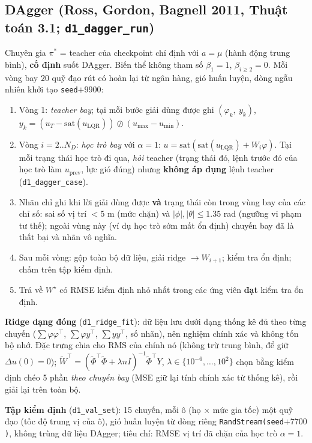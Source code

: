 \documentclass[11pt]{article}
\newcommand{\T}{^{\!\top}}
\newcommand{\uL}{u_{\mathrm{LQR}}}
\begin{document}
\subsection{DAgger (Ross, Gordon, Bagnell 2011, Thuật toán 3.1; \texttt{d1\_dagger\_run})}
Chuyên gia $\pi^*$ = teacher của checkpoint chỉ định với $a=\mu$ (hành động trung bình), \textbf{cố định} suốt DAgger. Biến thể
không tham số $\beta_1=1$, $\beta_{i\ge2}=0$. Mỗi vòng bay $20$ quỹ đạo rút có hoàn lại từ ngân hàng, gió huấn
luyện, dòng ngẫu nhiên khởi tạo \texttt{seed}$+9900$:
\begin{enumerate}[leftmargin=1.6em,itemsep=1pt]
\item Vòng 1: \emph{teacher bay}; tại mỗi bước giải dùng được ghi $(\varphi_k,\ y_k)$,
$y_k=(u_T-\mathrm{sat}(\uL))\oslash(u_{\max}-u_{\min})$.
\item Vòng $i=2..N_D$: \emph{học trò bay} với $\alpha=1$: $u=\mathrm{sat}(\mathrm{sat}(\uL)+W_i\varphi)$. Tại mỗi
trạng thái học trò đi qua, \emph{hỏi} teacher (trạng thái đó, lệnh trước đó của học trò làm $u_{\mathrm{prev}}$,
lực gió đúng) nhưng \textbf{không áp dụng} lệnh teacher (\texttt{d1\_dagger\_case}).
\item Nhãn chỉ ghi khi lời giải dùng được \textbf{và} trạng thái còn trong vùng bay của các chỉ số: sai số vị trí
$<5$ m (mức chặn) và $|\phi|,|\theta|\le1.35$ rad (ngưỡng vi phạm tư thế); ngoài vùng này (ví dụ học trò sớm mất
ổn định) chuyến bay đã là thất bại và nhãn vô nghĩa.
\item Sau mỗi vòng: gộp toàn bộ dữ liệu, giải ridge $\to W_{i+1}$; kiểm tra ổn định; chấm trên tập kiểm định.
\item Trả về $W^\star$ có RMSE kiểm định nhỏ nhất trong các ứng viên \textbf{đạt} kiểm tra ổn định.
\end{enumerate}
\textbf{Ridge dạng đóng} (\texttt{d1\_ridge\_fit}): dữ liệu lưu dưới dạng thống kê đủ theo từng chuyến
($\sum\varphi\varphi\T$, $\sum\varphi y\T$, $\sum yy\T$, số nhãn), nên nghiệm chính xác và không tốn bộ nhớ. Đặc
trưng chia cho RMS của chính nó (không trừ trung bình, để giữ $\Delta u(0)=0$);
$\tilde W\T=(\tilde\Phi\T\tilde\Phi+\lambda n I)^{-1}\tilde\Phi\T Y$, $\lambda\in\{10^{-6},\dots,10^{2}\}$ chọn bằng
kiểm định chéo 5 phần \emph{theo chuyến bay} (MSE giữ lại tính chính xác từ thống kê), rồi giải lại trên toàn bộ.

\textbf{Tập kiểm định} (\texttt{d1\_val\_set}): 15 chuyến, mỗi ô (họ $\times$ mức gia tốc) một quỹ đạo (tốc độ
trung vị của ô), gió huấn luyện từ dòng riêng \texttt{RandStream(seed}$+7700$\texttt{)}, không trùng dữ liệu
DAgger; tiêu chí: RMSE vị trí đã chặn của học trò $\alpha=1$.
\end{document}
